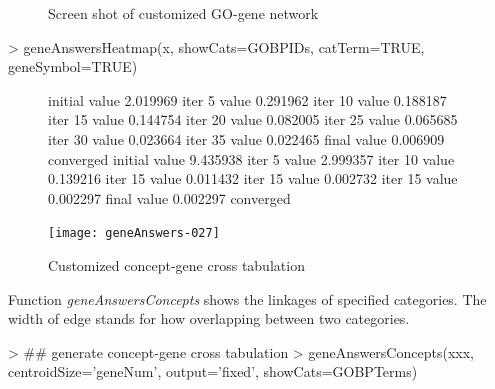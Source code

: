\documentclass[a4paper]{article}
\begin{document}
\begin{figure}
\centering
\centering
{}
\caption{Screen shot of customized GO-gene network}
\label{customized GO-genes network}
\end{figure}

\begin{Schunk}
\begin{Sinput}
> geneAnswersHeatmap(x, showCats=GOBPIDs, catTerm=TRUE, geneSymbol=TRUE)
\end{Sinput}
\end{Schunk}


\begin{figure}
\centering
\begin{Schunk}
\begin{Soutput}
initial  value 2.019969 
iter   5 value 0.291962
iter  10 value 0.188187
iter  15 value 0.144754
iter  20 value 0.082005
iter  25 value 0.065685
iter  30 value 0.023664
iter  35 value 0.022465
final  value 0.006909 
converged
initial  value 9.435938 
iter   5 value 2.999357
iter  10 value 0.139216
iter  15 value 0.011432
iter  15 value 0.002732
iter  15 value 0.002297
final  value 0.002297 
converged
\end{Soutput}
\end{Schunk}
\texttt{[image: geneAnswers-027]}
\caption{Customized concept-gene cross tabulation}
\label{fig:Customized concept-gene cross tabulation}
\end{figure}

Function {\it geneAnswersConcepts} shows the linkages of specified categories. The width of edge stands for how overlapping between two categories.
\begin{Schunk}
\begin{Sinput}
> ## generate concept-gene cross tabulation
> geneAnswersConcepts(xxx, centroidSize='geneNum', output='fixed', showCats=GOBPTerms) 
\end{Sinput}
\end{Schunk}
\end{document}
